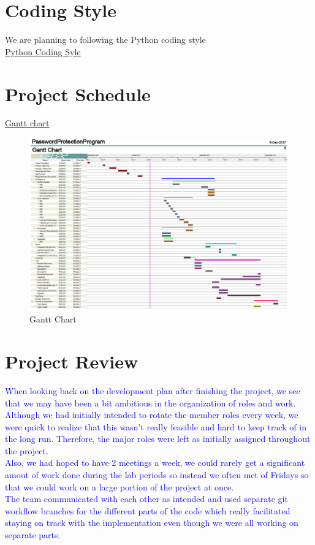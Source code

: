 \documentclass{article}
\begin{document}
\section{Coding Style}
We are planning to following the Python coding style\\
\href{https://google.github.io/styleguide/pyguide.html}{Python Coding Syle}

\section{Project Schedule}
\href{run:../../ProjectSchedule/Gantt-FinalSubmission.pdf}{Gantt chart}

\begin{figure}[h]
	\centering
	\includegraphics[scale=0.6]{images/Gantt.png}
	\caption{Gantt Chart}
	\label{fig:gantt}
\end{figure}

\section{Project Review}
\textcolor{blue}{When looking back on the development plan after finishing the project, we see that we may have been a bit ambitious in the organization of roles and work. Although we had initially intended to rotate the member roles every week, we were quick to realize that this wasn't really feasible and hard to keep track of in the long run. Therefore, the major roles were left as initially assigned throughout the project.} \\

\textcolor{blue}{Also, we had hoped to have 2 meetings a week, we could rarely get a significant amout of work done during the lab periods so instead we often met of Fridays so that we could work on a large portion of the project at once.} \\

\textcolor{blue}{The team communicated with each other as intended and used separate git workflow branches for the different parts of the code which really facilitated staying on track with the implementation even though we were all working on separate parts.}
\end{document}
